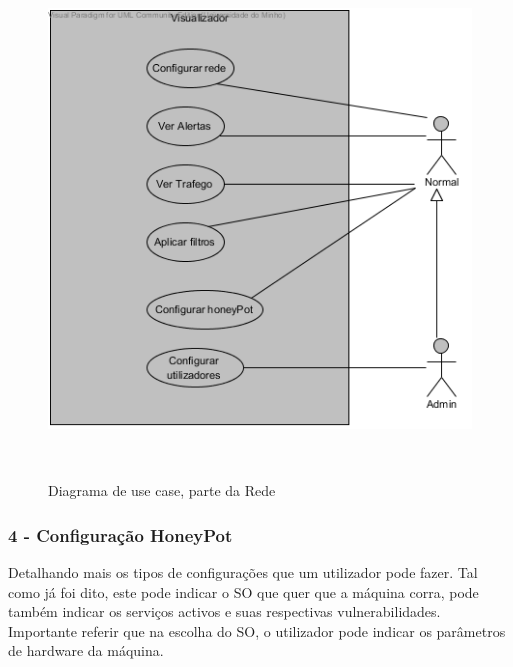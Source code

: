 \begin{figure}[!htb]
	\centering
	\includegraphics[scale=0.80]{images/ucs/Visualizador}
	\caption {Diagrama de use case, parte da Rede}~\label{fig: casodeusovisual}
\end{figure}
\pagebreak






\subsubsection{\textbf{4 - Configuração HoneyPot}}

Detalhando mais os tipos de configurações que um utilizador pode fazer. Tal como já foi dito, este pode indicar o SO que quer que a máquina corra, 
pode também indicar os serviços activos e suas respectivas vulnerabilidades. Importante referir que na escolha do SO, o utilizador pode indicar os 
parâmetros de hardware da máquina.

